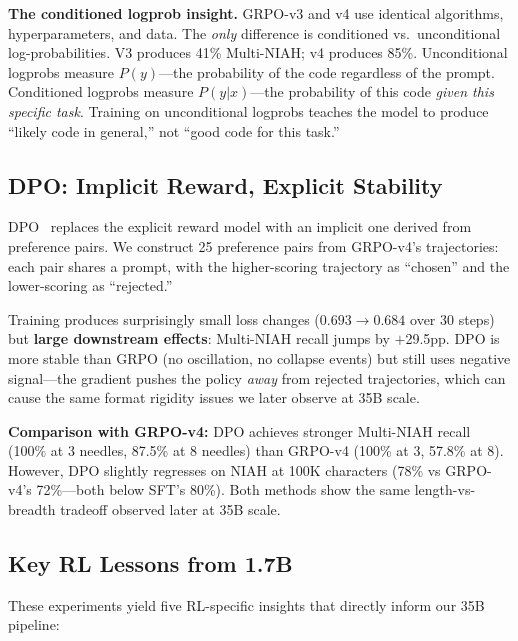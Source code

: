 \documentclass{article}
\begin{document}
\textbf{The conditioned logprob insight.} GRPO-v3 and v4 use identical algorithms, hyperparameters, and data. The \emph{only} difference is conditioned vs.\ unconditional log-probabilities. V3 produces 41\% Multi-NIAH; v4 produces 85\%. Unconditional logprobs measure $P(y)$---the probability of the code regardless of the prompt. Conditioned logprobs measure $P(y|x)$---the probability of this code \emph{given this specific task}. Training on unconditional logprobs teaches the model to produce ``likely code in general,'' not ``good code for this task.''

\subsection{DPO: Implicit Reward, Explicit Stability}

DPO~\cite{rafailov2023dpo} replaces the explicit reward model with an implicit one derived from preference pairs. We construct 25 preference pairs from GRPO-v4's trajectories: each pair shares a prompt, with the higher-scoring trajectory as ``chosen'' and the lower-scoring as ``rejected.''

Training produces surprisingly small loss changes ($0.693 \to 0.684$ over 30 steps) but \textbf{large downstream effects}: Multi-NIAH recall jumps by $+$29.5pp. DPO is more stable than GRPO (no oscillation, no collapse events) but still uses negative signal---the gradient pushes the policy \emph{away} from rejected trajectories, which can cause the same format rigidity issues we later observe at 35B scale.

\textbf{Comparison with GRPO-v4:} DPO achieves stronger Multi-NIAH recall (100\% at 3 needles, 87.5\% at 8 needles) than GRPO-v4 (100\% at 3, 57.8\% at 8). However, DPO slightly regresses on NIAH at 100K characters (78\% vs GRPO-v4's 72\%---both below SFT's 80\%). Both methods show the same length-vs-breadth tradeoff observed later at 35B scale.

\subsection{Key RL Lessons from 1.7B}

These experiments yield five RL-specific insights that directly inform our 35B pipeline:
\end{document}
